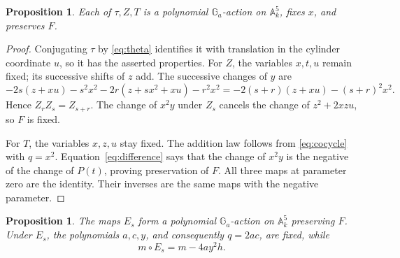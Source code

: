 \documentclass[11pt,letterpaper]{article}
\newcommand{\A}{\mathbb A}
\newcommand{\Ga}{\mathbb G_a}
\newtheorem{proposition}[theorem]{Proposition}
\theoremstyle{remark}
\begin{document}
\begin{proposition}\label{prop:standard}
Each of $\tau,Z,T$ is a polynomial $\Ga$-action on $\A^5_k$, fixes $x$, and preserves $F$.
\end{proposition}

\begin{proof}
Conjugating $\tau$ by \eqref{eq:theta} identifies it with translation in the cylinder coordinate $u$, so it has the asserted properties. For $Z$, the variables $x,t,u$ remain fixed; its successive shifts of $z$ add. The successive changes of $y$ are
\[
-2s(z+xu)-s^2x^2-2r(z+sx^2+xu)-r^2x^2
=-2(s+r)(z+xu)-(s+r)^2x^2.
\]
Hence $Z_rZ_s=Z_{s+r}$. The change of $x^2y$ under $Z_s$ cancels the change of $z^2+2xzu$, so $F$ is fixed.

For $T$, the variables $x,z,u$ stay fixed. The addition law follows from \eqref{eq:cocycle} with $q=x^2$. Equation~\eqref{eq:difference} says that the change of $x^2y$ is the negative of the change of $P(t)$, proving preservation of $F$. All three maps at parameter zero are the identity. Their inverses are the same maps with the negative parameter.
\end{proof}

\begin{proposition}\label{prop:fourth}
The maps $E_s$ form a polynomial $\Ga$-action on $\A^5_k$ preserving $F$. Under $E_s$, the polynomials $a,c,y$, and consequently $q=2ac$, are fixed, while
\begin{equation}\label{eq:mchange}
m\circ E_s=m-4ay^2h.
\end{equation}
\end{proposition}
\end{document}
